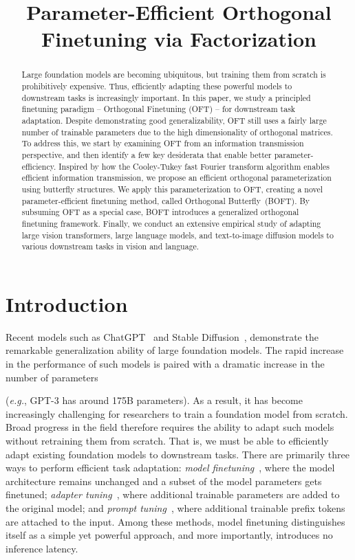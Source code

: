 \title{Parameter-Efficient Orthogonal Finetuning via Factorization}

\begin{abstract}
Large foundation models are becoming ubiquitous, but training them from scratch is prohibitively expensive. Thus, efficiently adapting these powerful models to downstream tasks is increasingly important. In this paper, we study a principled finetuning paradigm -- Orthogonal Finetuning (OFT) -- for downstream task adaptation. Despite demonstrating good generalizability, OFT still uses a fairly large number of trainable parameters due to the high dimensionality of orthogonal matrices. To address this, we start by examining OFT from an information transmission perspective, and then identify a few key desiderata that enable better parameter-efficiency. Inspired by how the Cooley-Tukey fast Fourier transform algorithm enables efficient information transmission, we propose an efficient orthogonal parameterization using  butterfly structures. We apply this parameterization to OFT, creating  a novel parameter-efficient finetuning method, called Orthogonal Butterfly~(BOFT). By subsuming OFT as a special case, BOFT introduces a generalized orthogonal finetuning framework. Finally, we conduct an extensive empirical study of adapting large vision transformers, large language models, and text-to-image diffusion models to various downstream tasks in vision and language.
\end{abstract}

\section{Introduction}

Recent models such as ChatGPT~\cite{brown2020language,chen2021evaluating} and Stable Diffusion~\cite{rombach2022high}, demonstrate the remarkable generalization ability of large foundation models. The rapid increase in the performance of such models is paired with a dramatic increase in the number of parameters

(\emph{e.g.}, GPT-3 has around 175B parameters). As a result, it has become increasingly challenging for researchers to train a foundation model from scratch. Broad progress in the field therefore requires the ability to adapt such models without retraining them from scratch. That is, we must be able to efficiently adapt existing foundation models to downstream tasks. There are primarily three ways to perform efficient task adaptation: \emph{model finetuning}~\cite{hulora2022,zaken2022bitfit,guo2020parameter,raffel2020exploring,qiu2023controlling,zhang2022adaptive,chavan2023one}, where the model architecture remains unchanged and a subset of the model parameters gets finetuned; \emph{adapter tuning}~\cite{rebuffi2017learning,houlsby2019parameter,pfeiffer2020adapterfusion,lin2020exploring,he2021towards}, where additional trainable parameters are added to the original model; and \emph{prompt tuning}~\cite{li2021prefix,lester2021power}, where additional trainable prefix tokens are attached to the input. Among these methods, model finetuning distinguishes itself as a simple yet powerful approach, and more importantly, introduces no inference latency.

